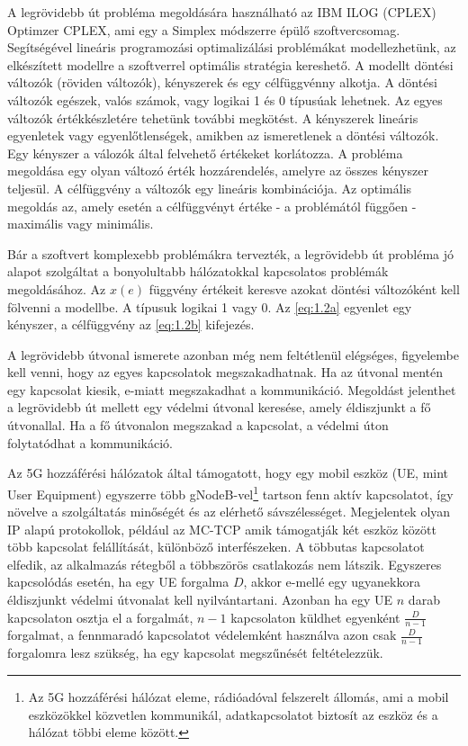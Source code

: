 \documentclass[a4paper,oneside]{article}
\begin{document}
A legrövidebb út probléma megoldására használható az IBM ILOG (CPLEX) Optimzer CPLEX,
ami egy a Simplex módszerre épülő szoftvercsomag.
Segítségével lineáris programozási optimalizálási \linebreak problémákat modellezhetünk,
az elkészített modellre a szoftverrel optimális stratégia kereshető.
A modellt döntési változók (röviden változók), kényszerek és egy célfüggvénny alkotja.
A döntési változók egészek, valós számok, vagy logikai 1 és 0 típusúak lehetnek.
Az egyes változók értékkészletére tehetünk további megkötést.
A kényszerek lineáris egyenletek vagy egyenlőtlenségek, amikben az ismeretlenek a döntési változók.
Egy kényszer a válozók által felvehető értékeket korlátozza.
A probléma megoldása egy olyan változó érték hozzárendelés, amelyre az összes kényszer teljesül.
A célfüggvény a változók egy lineáris kombinációja.
Az optimális megoldás az, amely esetén a célfüggvényt értéke - a problémától függően - maximális vagy minimális.

Bár a szoftvert komplexebb problémákra tervezték, a legrövidebb út probléma jó
alapot szolgáltat a bonyolultabb hálózatokkal kapcsolatos problémák megoldásához.
Az $x(e)$ függvény értékeit keresve azokat döntési változóként kell fölvenni a modellbe.
A típusuk logikai 1 vagy 0.
Az \eqref{eq:1.2a} egyenlet egy kényszer, a célfüggvény az \eqref{eq:1.2b} kifejezés.

A legrövidebb útvonal ismerete azonban még nem feltétlenül elégséges,
figyelembe kell venni, hogy az egyes kapcsolatok megszakadhatnak.
Ha az útvonal mentén egy kapcsolat kiesik, e-miatt megszakadhat a kommunikáció.
Megoldást jelenthet a legrövidebb út mellett egy védelmi útvonal keresése,
amely \linebreak éldiszjunkt a fő útvonallal.
Ha a fő útvonalon megszakad a kapcsolat, a védelmi úton folytatódhat a kommunikáció.

Az 5G hozzáférési hálózatok által támogatott, hogy egy mobil eszköz (UE, mint User Equipment)
egyszerre több gNodeB-vel\footnote{
  Az 5G hozzáférési hálózat eleme, rádióadóval felszerelt állomás, ami a mobil eszközökkel közvetlen kommunikál,
  adatkapcsolatot biztosít az eszköz és a hálózat többi eleme között.
  }
tartson fenn aktív kapcsolatot, így növelve a szolgáltatás minőségét és az elérhető sávszélességet. \cite{multiconnectivity}
Megjelentek olyan IP alapú protokollok, például az MC-TCP \cite{mptcp} amik \linebreak támogatják két eszköz között több kapcsolat felállítását, különböző interfészeken.
A többutas kapcsolatot elfedik, az alkalmazás rétegből a többszörös csatlakozás nem látszik.
Egyszeres kapcsolódás esetén, ha egy UE forgalma $D$, akkor e-mellé egy ugyanekkora éldiszjunkt védelmi útvonalat kell nyilvántartani.
Azonban ha egy UE $n$ darab kapcsolaton osztja el a forgalmát, $n - 1$ kapcsolaton küldhet egyenként $\frac{D}{n - 1}$ forgalmat, a
fennmaradó kapcsolatot védelemként használva azon csak $\frac{D}{n - 1}$ forgalomra lesz szükség, ha egy kapcsolat megszűnését feltételezzük.
\end{document}
